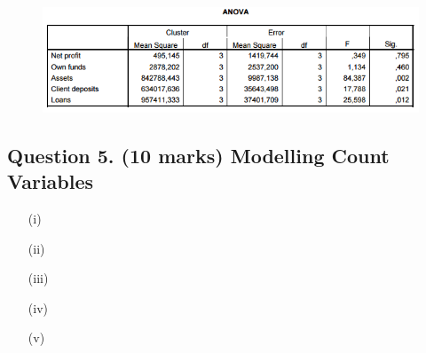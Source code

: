 \documentclass[a4paper,12pt]{article}
\begin{document}
\begin{figure}[h!]
\centering
\includegraphics[width=1.1\linewidth]{ANOVA}
\caption{}
\label{fig:ANOVA}
\end{figure}


\newpage

\subsection*{Question 5. (10 marks) Modelling Count Variables }


\begin{itemize}
	\item[(i)] 
	
	\item[(ii)]
	
	\item[(iii)] 
	
	\item[(iv)] 
	
	\item[(v)] 
\end{itemize}
\end{document}
